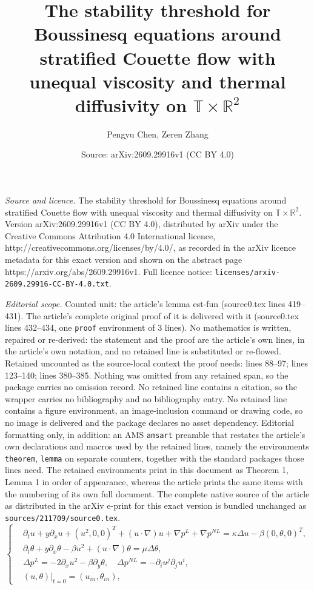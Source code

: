 \documentclass[10pt,a4paper]{amsart}
\title{The stability threshold for Boussinesq equations around stratified Couette flow with unequal viscosity and thermal diffusivity on $\mathbb{T}\times\mathbb{R}^2$}
\author{Pengyu Chen, Zeren Zhang}
\date{Source: arXiv:2609.29916v1 (CC BY 4.0)}
\begin{document}
\maketitle

\noindent\emph{Source and licence.} The stability threshold for Boussinesq equations around stratified Couette flow with unequal viscosity and thermal diffusivity on $\mathbb{T}\times\mathbb{R}^2$. Version arXiv:2609.29916v1 (CC BY 4.0), distributed by arXiv under the Creative Commons Attribution 4.0 International licence, http://creativecommons.org/licenses/by/4.0/, as recorded in the arXiv licence metadata for this exact version and shown on the abstract page https://arxiv.org/abs/2609.29916v1. Full licence notice: \texttt{licenses/arxiv-2609.29916-CC-BY-4.0.txt}.\par\smallskip

\noindent\textit{Editorial scope.} Counted unit: the article's lemma est-fun (source0.tex lines 419--431). The article's complete original proof of it is delivered with it (source0.tex lines 432--434, one \texttt{proof} environment of 3 lines). No mathematics is written, repaired or re-derived: the statement and the proof are the article's own lines, in the article's own notation, and no retained line is substituted or re-flowed.  Retained uncounted as the source-local context the proof needs: lines 88--97; lines 123--140; lines 380--385.  Nothing was omitted from any retained span, so the package carries no omission record.  No retained line contains a citation, so the wrapper carries no bibliography and no bibliography entry.  No retained line contains a figure environment, an image-inclusion command or drawing code, so no image is delivered and the package declares no asset dependency.  Editorial formatting only, in addition: an AMS \texttt{amsart} preamble that restates the article's own declarations and macros used by the retained lines, namely the environments \texttt{theorem}, \texttt{lemma} on separate counters, together with the standard packages those lines need.  The retained environments print in this document as Theorem 1, Lemma 1 in order of appearance, whereas the article prints the same items with the numbering of its own full document.  The complete native source of the article as distributed in the arXiv e-print for this exact version is bundled unchanged as \texttt{sources/211709/source0.tex}.
	\begin{equation}\label{eq-main}
		\left\{
		\begin{aligned}
			&\partial_t u+y\partial_x u+(u^2,0,0)^T+(u\cdot\nabla)u+\nabla p^L+\nabla p^{NL}=\kappa \Delta u-\beta(0,\theta,0)^T,\\
			&\partial_t \theta+y\partial_x \theta-\beta u^2+(u\cdot\nabla)\theta=\mu\Delta\theta,\\
			&\Delta p^L=-2\partial_x u^2-\beta\partial_y \theta,\quad\Delta p^{NL}=-\partial_i u^j\partial_j u^i,\\
			&(u,\theta)|_{t=0}=(u_{in},\theta_{in}),
		\end{aligned}
		\right.
	\end{equation}
\end{document}
